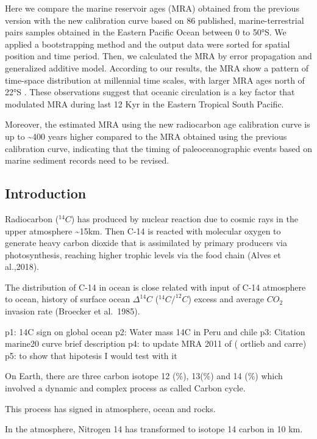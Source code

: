 \documentclass[
]{article}
\begin{document}
Here we compare the marine reservoir ages (MRA) obtained from the
previous version with the new calibration curve based on 86 published,
marine-terrestrial pairs samples obtained in the Eastern Pacific Ocean
between 0 to 50°S. We applied a bootstrapping method and the output data
were sorted for spatial position and time period. Then, we calculated
the MRA by error propagation and generalized additive model. According
to our results, the MRA show a pattern of time-space distribution at
millennial time scales, with larger MRA ages north of 22°S . These
observations suggest that oceanic circulation is a key factor that
modulated MRA during last 12 Kyr in the Eastern Tropical South Pacific.

Moreover, the estimated MRA using the new radiocarbon age calibration
curve is up to \textasciitilde400 years higher compared to the MRA
obtained using the previous calibration curve, indicating that the
timing of paleoceanographic events based on marine sediment records need
to be revised.

\hypertarget{introduction}{%
\subsection{Introduction}\label{introduction}}

Radiocarbon (\(^{14}C\)) has produced by nuclear reaction due to cosmic
rays in the upper atmosphere \textasciitilde15km. Then C-14 is reacted
with molecular oxygen to generate heavy carbon dioxide that is
assimilated by primary producers via photosynthesis, reaching higher
trophic levels via the food chain (Alves et al.,2018).

The distribution of C-14 in ocean is close related with input of C-14
atmosphere to ocean, history of surface ocean \(\Delta^{14}C\)
(\(^{14}C/^{12}C\)) excess and average \(CO_2\) invasion rate (Broecker
et al.~1985).

p1: 14C sign on global ocean p2: Water mass 14C in Peru and chile p3:
Citation marine20 curve brief description p4: to update MRA 2011 of (
ortlieb and carre) p5: to show that hipotesis I would test with it

On Earth, there are three carbon isotope 12 (\%), 13(\%) and 14 (\%)
which involved a dynamic and complex process as called Carbon cycle.

This process has signed in atmosphere, ocean and rocks.

In the atmosphere, Nitrogen 14 has transformed to isotope 14 carbon in
10 km.
\end{document}
